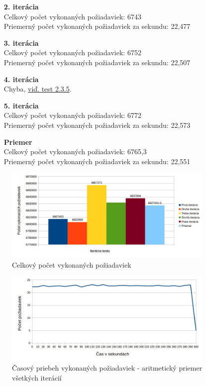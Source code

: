 \documentclass[12pt,oneside,final]{fithesis-utf8}
\begin{document}
\begin{itemize}
\begin{itemize}
\item[\textbf{2. iterácia}]\ \\
Celkový počet vykonaných požiadaviek: 6743\\
Priemerný počet vykonaných požiadaviek za sekundu: 22,477

\item[\textbf{3. iterácia}]\ \\
Celkový počet vykonaných požiadaviek: 6752\\
Priemerný počet vykonaných požiadaviek za sekundu: 22,507

\item[\textbf{4. iterácia}]\ \\
Chyba, \hyperlink{label}{viď. test 2.3.5}.

\item[\textbf{5. iterácia}]\ \\
Celkový počet vykonaných požiadaviek: 6772\\
Priemerný počet vykonaných požiadaviek za sekundu: 22,573

\item[\textbf{Priemer}]\ \\
Celkový počet vykonaných požiadaviek: 6765,3\\
Priemerný počet vykonaných požiadaviek za sekundu: 22,551

\end{itemize}

\begin{figure}[H]
  \centering
      \includegraphics[width=0.9\textwidth]{faban3_4.jpg}
  \caption{Celkový počet vykonaných požiadaviek}
\end{figure}

\begin{figure}[H]
  \centering
      \includegraphics[width=0.9\textwidth]{faban3_4_distr.jpg}
  \caption{Časový priebeh vykonaných požiadaviek - aritmetický priemer všetkých iterácií}
\end{figure}


\end{itemize}
\end{document}
